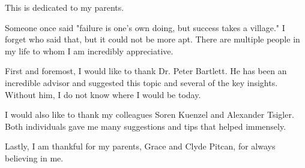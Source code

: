 \documentclass{ucbthesis}
\begin{document}
\begin{frontmatter}

\begin{dedication}
\null\vfil
\begin{center}
This is dedicated to my parents.
\end{center}
\vfil\null
\end{dedication}


\tableofcontents
\clearpage
\listoffigures
\clearpage
\listoftables

\begin{acknowledgements}
	
Someone once said "failure is one's own doing, but success takes a village." I forget who said that, but it could not be more apt. There are multiple people in my life to whom I am incredibly appreciative.

First and foremost, I would like to thank Dr. Peter Bartlett. He has been an incredible advisor and suggested this topic and several of the key insights. Without him, I do not know where I would be today.

I would also like to thank my colleagues Soren Kuenzel and Alexander Tsigler. Both individuals gave me many suggestions and tips that helped immensely.

Lastly, I am thankful for my parents, Grace and Clyde Pitcan, for always believing in me.

\end{acknowledgements}

\end{frontmatter}

\pagestyle{headings}








\printbibliography

\end{document}
